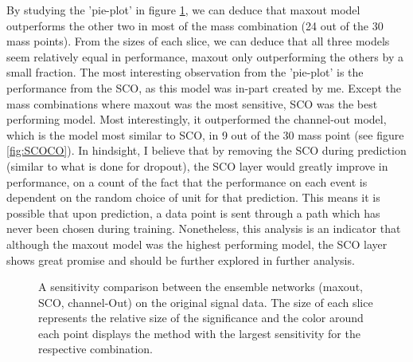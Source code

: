 By studying the 'pie-plot' in figure \ref{fig:EnsembleComp}, we can deduce that maxout model outperforms the other two in most of the mass 
combination (24 out of the 30 mass points). From the sizes of each slice, we can deduce that all three models seem relatively equal in performance, maxout only 
outperforming the others by a small fraction. The most interesting observation from the 'pie-plot' is the performance from the \ac{SCO}, as 
this model was in-part created by me. Except the mass combinations where maxout was the most sensitive, \ac{SCO} was the best performing model. 
Most interestingly, it outperformed the channel-out model, which is the model most similar to \ac{SCO}, in 9 out of the 30 mass point (see figure \ref{fig:SCOCO}). 
In hindsight, I believe that by removing the \ac{SCO} during prediction (similar to what is done for dropout), the \ac{SCO} layer would greatly 
improve in performance, on a count of the fact that the performance on each event is dependent on the random choice of unit for that prediction.
This means it is possible that upon prediction, a data point is sent through a path which has never been chosen during training. 
Nonetheless, this analysis is an indicator that although the maxout model was the highest performing model, the \ac{SCO} layer shows 
great promise and should be further explored in further analysis. 
\begin{figure}
    \caption[A sensitivity comparison between the ensemble networks (maxout, \acs{SCO}, channel-Out) on the original 
    signal data.]{A sensitivity comparison between the ensemble networks (maxout, \acs{SCO}, channel-Out) on the original 
    signal data. The size of each slice represents the relative size of the significance and the color around each 
    point displays the method with the largest sensitivity for the respective combination.}
    \label{fig:EnsembleComp}
\end{figure}

